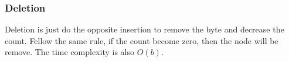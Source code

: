 \subsubsection{Deletion}

Deletion is just do the opposite insertion to remove the byte and decrease the count. Fellow the same rule, if the count become zero, then the node will be remove. The time complexity is also $O(b)$.
